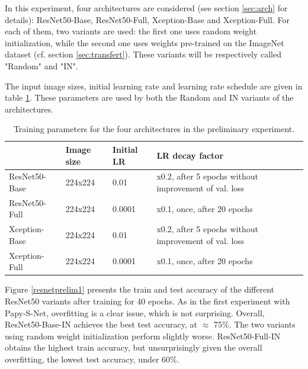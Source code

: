 \documentclass[11pt]{report}
\begin{document}
In this experiment, four architectures are considered (see section \ref{sec:arch} for details): ResNet50-Base, ResNet50-Full, Xception-Base and Xception-Full. For each of them, two variants are used: the first one uses random weight initialization, while the second one uses weights pre-trained on the ImageNet dataset (cf. section \ref{sec:transfert}). These variants will be respectively called "Random" and "IN".\newline

The input image sizes, initial learning rate and learning rate schedule are given in table \ref{prelimtable}. These parameters are used by both the Random and IN variants of the architectures.

\begin{table}[h!]
\begin{tabular}{l|l|l|l|}
\cline{2-4}
                                    & Image size & Initial LR & LR decay factor                                             \\ \hline
\multicolumn{1}{|l|}{ResNet50-Base} & 224x224    & 0.01                  & x0.2, after 5 epochs without improvement of val. loss \\ \hline
\multicolumn{1}{|l|}{ResNet50-Full} & 224x224    & 0.0001                & x0.1, once, after 20 epochs                                 \\ \hline
\multicolumn{1}{|l|}{Xception-Base} & 224x224    & 0.01                  & x0.2, after 5 epochs without improvement of val. loss \\ \hline
\multicolumn{1}{|l|}{Xception-Full} & 224x224    & 0.0001                & x0.1, once, after 20 epochs                                 \\ \hline
\end{tabular}
\caption{Training parameters for the four architectures in the preliminary experiment.}
\label{prelimtable}
\end{table}

Figure \ref{resnetprelim1} presents the train and test accuracy of the different ResNet50 variants after training for 40 epochs. As in the first experiment with Papy-S-Net, overfitting is a clear issue, which is not surprising. Overall, ResNet50-Base-IN achieves the best test accuracy, at $\approx$ 75\%. The two variants using random weight initialization perform slightly worse.\newline
ResNet50-Full-IN obtains the highest train accuracy, but unsurprisingly given the overall overfitting, the lowest test accuracy, under 60\%.\newline
\end{document}
